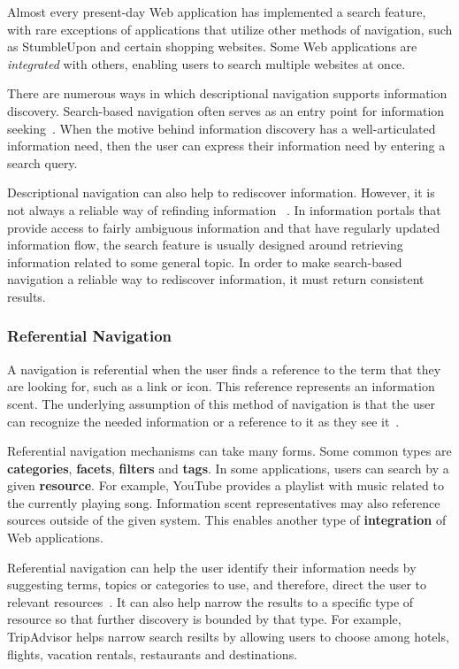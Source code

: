 {{{Almost every present-day Web application has implemented a search feature, with rare exceptions of applications that utilize other methods of navigation, such as StumbleUpon and certain shopping websites. Some Web applications are \textit{integrated} with others, enabling users to search multiple websites at once.    

There are numerous ways in which descriptional navigation supports information discovery. Search-based navigation often serves as an entry point for information seeking~\cite{levene2011introduction}. When the motive behind information discovery has a well-articulated information need, then the user can express their information need by entering a search query. 

Descriptional navigation can also help to rediscover information. However, it is not always a reliable way of refinding information ~\cite{cockburn2003improving}. In information portals that provide access to fairly ambiguous information and that have regularly updated information flow, the search feature is usually designed around retrieving information related to some general topic. In order to make search-based navigation a reliable way to rediscover information, it must return consistent results. 
} %

{\subsubsection{Referential Navigation}
A navigation is referential when the user finds a reference to the term that they are looking for, such as a link or icon. This reference represents an information scent. The underlying assumption of this method of navigation is that the user can recognize the needed information or a reference to it as they see it~\cite{waterworth1991model}. 

Referential navigation mechanisms can take many forms. Some common types are \textbf{categories}, \textbf{facets}, \textbf{filters} and \textbf{tags}. In some applications, users can search by a given \textbf{resource}. For example, YouTube provides a playlist with music related to the currently playing song. Information scent representatives may also reference sources outside of the given system. This enables another type of \textbf{integration} of Web applications. 

Referential navigation can help the user identify their information needs by suggesting terms, topics or categories to use, and therefore, direct the user to relevant resources~\cite{levene2011introduction}. It can also help narrow the results to a specific type of resource so that further discovery is bounded by that type. For example, TripAdvisor helps narrow search resilts by allowing users to choose among hotels, flights, vacation rentals, restaurants and destinations.

}}}
